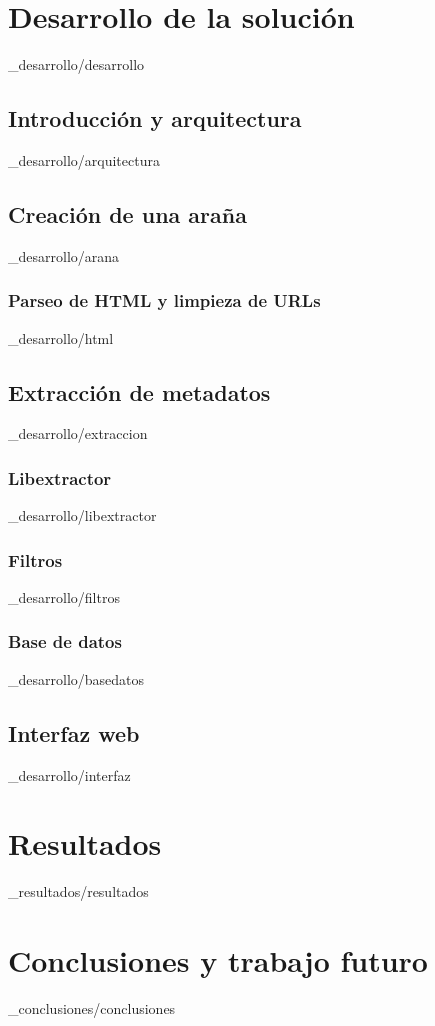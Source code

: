 \documentclass[epsbased,copyright,final,printable,covers,extendedindex,firstnumbered,tfg,gnuplot]{tfgtfmthesisuam}
\begin{document}
\chapter{Desarrollo de la solución\label{CAP:SOLUCION}}{_desarrollo/desarrollo}
  \section{Introducción y arquitectura\label{SEC:ARQUITECTURA}}{_desarrollo/arquitectura}
  \section{Creación de una araña\label{SEC:ARANA}}{_desarrollo/arana}
    \subsection{Parseo de HTML y limpieza de URLs\label{SS:HTMLPARSER}}{_desarrollo/html}
  \section{Extracción de metadatos\label{SEC:EXTRACION}}{_desarrollo/extraccion}
    \subsection{Libextractor\label{SS:LIBEXTRACTOR}}{_desarrollo/libextractor}
    \subsection{Filtros\label{SS:FILTROS}}{_desarrollo/filtros}
    \subsection{Base de datos\label{SS:BD}}{_desarrollo/basedatos}
  \section{Interfaz web\label{SEC:WUI}}{_desarrollo/interfaz}

\chapter{Resultados\label{CAP:RESULTADOS}}{_resultados/resultados}

\chapter{Conclusiones y trabajo futuro\label{CAP:ELEMINT}}{_conclusiones/conclusiones}
\end{document}
